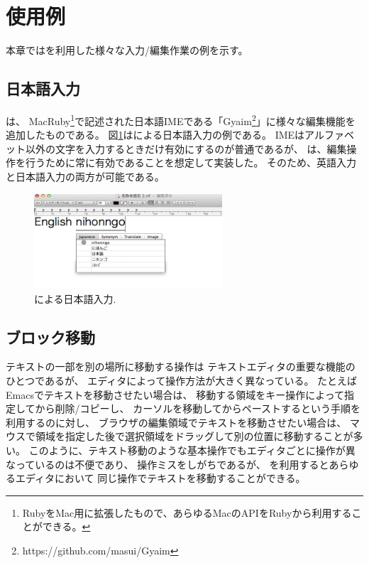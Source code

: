 \section{{\system}使用例}

本章では{\system}を利用した様々な入力/編集作業の例を示す。

\subsection{日本語入力}

{\system}は、
MacRuby\footnote{
  RubyをMac用に拡張したもので、あらゆるMacのAPIをRubyから利用することができる。
}で記述された日本語IMEである「Gyaim\footnote{
 \textsf{https://github.com/masui/Gyaim}
}」に様々な編集機能を追加したものである。
%
図\ref{japaneseinput}は{\system}による日本語入力の例である。
IMEはアルファベット以外の文字を入力するときだけ有効にするのが普通であるが、
{\system}は、編集操作を行うために常に有効であることを想定して実装した。
そのため、英語入力と日本語入力の両方が可能である。

\begin{figure}[H]
\centerline{\includegraphics[width=70mm,bb=0 0 600 400]{figures/japanese.png}}
\caption{{\system}による日本語入力.}
\label{japaneseinput}
\end{figure}

\subsection{ブロック移動}

テキストの一部を別の場所に移動する操作は
テキストエディタの重要な機能のひとつであるが、
エディタによって操作方法が大きく異なっている。
たとえばEmacsでテキストを移動させたい場合は、
移動する領域をキー操作によって指定してから削除/コピーし、
カーソルを移動してからペーストするという手順を利用するのに対し、
ブラウザの編集領域でテキストを移動させたい場合は、
マウスで領域を指定した後で選択領域をドラッグして別の位置に移動することが多い。
このように、テキスト移動のような基本操作でもエディタごとに操作が異なっているのは不便であり、
操作ミスをしがちであるが、
{\system}を利用するとあらゆるエディタにおいて
同じ操作でテキストを移動することができる。


